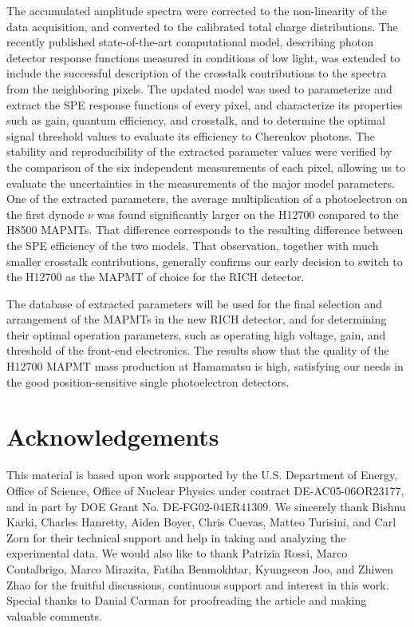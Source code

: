 The accumulated amplitude spectra were corrected to the non-linearity of the data acquisition, and converted to the calibrated total charge distributions. The recently published state-of-the-art computational model, describing photon detector response functions measured in conditions of low light, was extended to include the successful description of the crosstalk contributions to the spectra from the neighboring pixels. The updated model was used to parameterize and extract the SPE response functions of every pixel, and characterize its properties such as gain, quantum efficiency, and crosstalk, and to determine the optimal signal threshold values to evaluate its efficiency to Cherenkov photons. The stability and reproducibility of the extracted parameter values were verified by the comparison of the six independent measurements of each pixel, allowing us to evaluate the uncertainties in the measurements of the major model parameters. One of the extracted parameters, the average multiplication of a photoelectron on the first dynode $\nu$ was found significantly larger on the H12700 compared to the H8500 MAPMTs. That difference corresponds to the resulting difference between the SPE efficiency of the two models.  That observation, together with much smaller crosstalk contributions, generally confirms our early decision to switch to the H12700 as the MAPMT of choice for the RICH detector.

The database of extracted parameters will be used for the final selection and arrangement of the MAPMTs in the new RICH detector, and for determining their optimal operation parameters, such as operating high voltage, gain, and threshold of the front-end electronics. The results show that the quality of the H12700 MAPMT mass production at Hamamatsu is high, satisfying our needs in the good position-sensitive single photoelectron detectors.



\section{Acknowledgements}
This material is based upon work supported by the U.S. Department of Energy, Office of Science, Office of Nuclear Physics under contract DE-AC05-06OR23177, and in part by DOE Grant No. DE-FG02-04ER41309.
We sincerely thank 
Bishnu Karki,
Charles Hanretty,
Aiden Boyer,
Chris  Cuevas,
Matteo Turisini, and
Carl Zorn
for their technical support and help in taking and analyzing the experimental data. We would
also like to thank 
Patrizia Rossi, 
Marco Contalbrigo, 
Marco Mirazita,
Fatiha Benmokhtar,
Kyungseon Joo,
and Zhiwen Zhao
for the fruitful discussions, continuous support and interest in this work. Special thanks to Danial Carman for proofreading the article and making valuable comments.